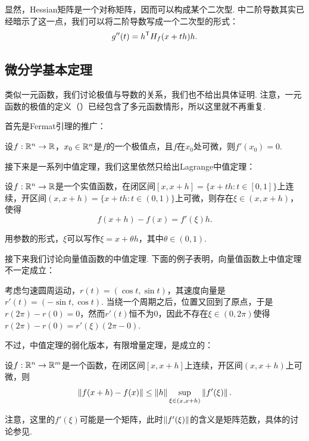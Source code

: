 显然，Hessian矩阵是一个对称矩阵，因而可以构成某个二次型.  中二阶导数其实已经暗示了这一点，我们可以将二阶导数写成一个二次型的形式：
\[g''(t)=h^{\mathsf{T}} H_f(x+th)h.\]

\subsection{微分学基本定理}

类似一元函数，我们讨论极值与导数的关系，我们也不给出具体证明. 注意，一元函数的极值的定义（）已经包含了多元函数情形，所以这里就不再重复. 

首先是Fermat引理的推广：

\begin{lemma}[Fermat引理]\label{lemma:fermat-multi}
    设$f:\mathbb{R}^n\to\mathbb{R}$，$x_0\in\mathbb{R}^n$是$f$的一个极值点，且$f$在$x_0$处可微，则$f'(x_0)=0$.
\end{lemma}

接下来是一系列中值定理，我们这里依然只给出Lagrange中值定理：

\begin{theorem}[Lagrange中值定理]\label{theorem:lagrange-mid-multi}
    设$f:\mathbb{R}^n\to\mathbb{R}$是一个实值函数，在闭区间$[x,x+h]=\{x+th:t\in[0,1]\}$上连续，开区间$(x,x+h)=\{x+th:t\in(0,1)\}$上可微，则存在$\xi\in(x,x+h)$，使得
    \[
        f(x+h)-f(x)=f'(\xi)h.
    \]
\end{theorem}
用参数的形式，$\xi$可以写作$\xi=x+\theta h$，其中$\theta\in(0,1)$.

接下来我们讨论向量值函数的中值定理. 下面的例子表明，向量值函数上中值定理不一定成立：
\begin{example}
考虑匀速圆周运动，$r(t)=(\cos t,\sin t)$，其速度向量是$r'(t)=(-\sin t,\cos t)$. 当绕一个周期之后，位置又回到了原点，于是$r(2\pi)-r(0)=0$，然而$r'(t)$恒不为$0$，因此不存在$\xi\in(0,2\pi)$使得$r(2\pi)-r(0)=r'(\xi)(2\pi-0)$.
\end{example}

不过，中值定理的弱化版本，有限增量定理，是成立的：

\begin{theorem}[Lagrange有限增量定理]\label{theorem:lagrange-finite-multi}
    设$f:\mathbb{R}^n\to\mathbb{R}^m$是一个函数，在闭区间$[x,x+h]$上连续，开区间$(x,x+h)$上可微，则
    \[
        \left\|f(x+h)-f(x)\right\|\leq \left\|h\right\|\sup_{\xi\in(x,x+h)}\left\|f'(\xi)\right\|.
    \]
\end{theorem}

注意，这里的$f'(\xi)$可能是一个矩阵，此时$\left\|f'(\xi)\right\|$的含义是矩阵范数，具体的讨论参见. 

